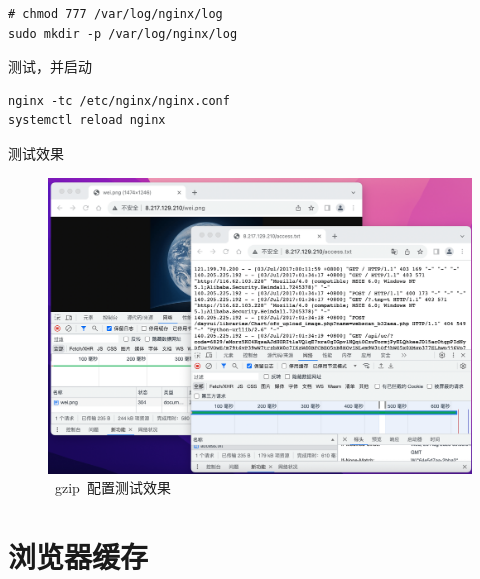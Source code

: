 \documentclass[12pt, a4paper]{article} %
\renewcommand{\figurename}{图} %
\begin{document}
\begin{CJK*}{UTF8}{gbsn}
\begin{lstlisting}
# chmod 777 /var/log/nginx/log
sudo mkdir -p /var/log/nginx/log
\end{lstlisting}
测试，并启动
\begin{lstlisting}
nginx -tc /etc/nginx/nginx.conf
systemctl reload nginx
\end{lstlisting}
测试效果
\renewcommand{\figurename}{图} %
\begin{figure}[htbp]
    \centering
    \includegraphics[width=1\textwidth]{./imgs/catch2023-08-23-18.09.54.png}
    \caption{~gzip~配置测试效果}
\end{figure}

\clearpage
\section{浏览器缓存}


\end{CJK*}
\end{document}

